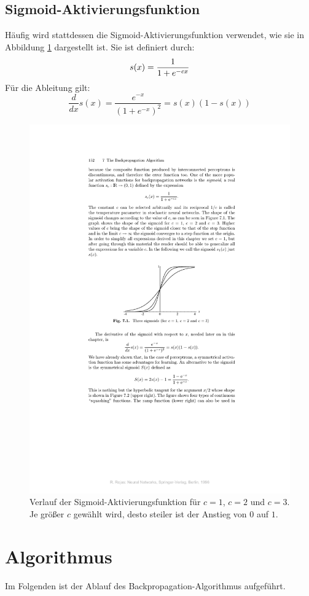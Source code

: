 \subsection*{Sigmoid-Aktivierungsfunktion}
Häufig wird stattdessen die Sigmoid-Aktivierungsfunktion verwendet, wie sie in Abbildung \ref{fig:ch03_sigmoid} dargestellt ist. Sie ist definiert durch:
\[
	s(x) = \frac{1}{1 + e^{-cx}} \\
\]
Für die Ableitung gilt:
\[
	\frac{d}{dx} s(x) = \frac{e^{-x}}{(1 + e^{-x})^2} = s(x)(1-s(x))
\]

\begin{figure}[ht!] \centering 
	\includegraphics[width=0.7\linewidth]{figures/ch03_sigmoid.pdf}
	\caption{Verlauf der Sigmoid-Aktivierungsfunktion für $c=1$, $c=2$ und $c=3$. Je größer $c$ gewählt wird, desto steiler ist der Anstieg von $0$ auf $1$.}
	\label{fig:ch03_sigmoid}
\end{figure}



\section*{Algorithmus}
Im Folgenden ist der Ablauf des Backpropagation-Algorithmus aufgeführt.

